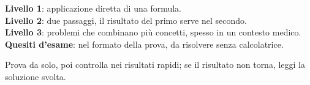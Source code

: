 
\begin{tcolorbox}[fisbox={formula}{formulaBg},title={Come usare l'eserciziario}]
\textbf{Livello 1}: applicazione diretta di una formula.\\
\textbf{Livello 2}: due passaggi, il risultato del primo serve nel secondo.\\
\textbf{Livello 3}: problemi che combinano più concetti, spesso in un contesto medico.\\
\textbf{Quesiti d'esame}: nel formato della prova, da risolvere senza calcolatrice.

Prova da solo, poi controlla nei risultati rapidi; se il risultato non torna, leggi la soluzione svolta.
\end{tcolorbox}


